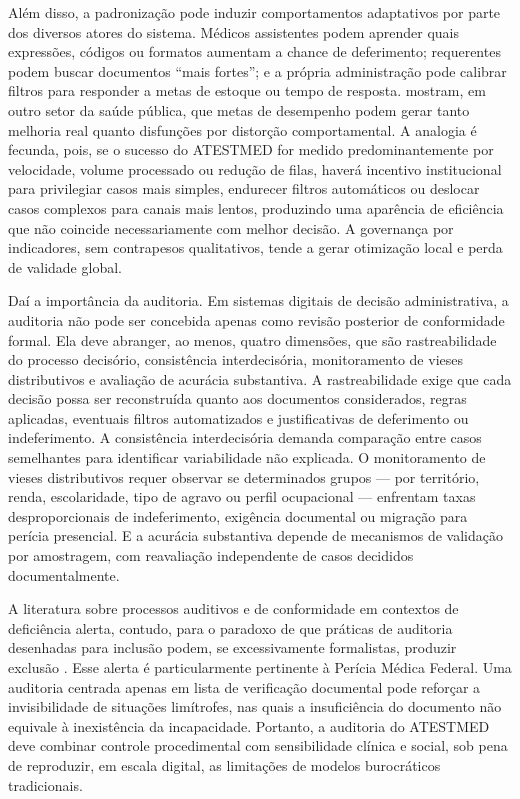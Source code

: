 \documentclass[12pt,a4paper]{article}
\begin{document}
Além disso, a padronização pode induzir comportamentos adaptativos por parte dos diversos atores do sistema. Médicos assistentes podem aprender quais expressões, códigos ou formatos aumentam a chance de deferimento; requerentes podem buscar documentos “mais fortes”; e a própria administração pode calibrar filtros para responder a metas de estoque ou tempo de resposta. \textcite{kelman2009performanceimprovementandperformancedysfunctionanemp} mostram, em outro setor da saúde pública, que metas de desempenho podem gerar tanto melhoria real quanto disfunções por distorção comportamental. A analogia é fecunda, pois, se o sucesso do ATESTMED for medido predominantemente por velocidade, volume processado ou redução de filas, haverá incentivo institucional para privilegiar casos mais simples, endurecer filtros automáticos ou deslocar casos complexos para canais mais lentos, produzindo uma aparência de eficiência que não coincide necessariamente com melhor decisão. A governança por indicadores, sem contrapesos qualitativos, tende a gerar otimização local e perda de validade global.

Daí a importância da auditoria. Em sistemas digitais de decisão administrativa, a auditoria não pode ser concebida apenas como revisão posterior de conformidade formal. Ela deve abranger, ao menos, quatro dimensões, que são rastreabilidade do processo decisório, consistência interdecisória, monitoramento de vieses distributivos e avaliação de acurácia substantiva. A rastreabilidade exige que cada decisão possa ser reconstruída quanto aos documentos considerados, regras aplicadas, eventuais filtros automatizados e justificativas de deferimento ou indeferimento. A consistência interdecisória demanda comparação entre casos semelhantes para identificar variabilidade não explicada. O monitoramento de vieses distributivos requer observar se determinados grupos — por território, renda, escolaridade, tipo de agravo ou perfil ocupacional — enfrentam taxas desproporcionais de indeferimento, exigência documental ou migração para perícia presencial. E a acurácia substantiva depende de mecanismos de validação por amostragem, com reavaliação independente de casos decididos documentalmente.

A literatura sobre processos auditivos e de conformidade em contextos de deficiência alerta, contudo, para o paradoxo de que práticas de auditoria desenhadas para inclusão podem, se excessivamente formalistas, produzir exclusão \parencite{deveau2011workplaceaccommodationandauditbasedevaluationprocess}. Esse alerta é particularmente pertinente à Perícia Médica Federal. Uma auditoria centrada apenas em lista de verificação documental pode reforçar a invisibilidade de situações limítrofes, nas quais a insuficiência do documento não equivale à inexistência da incapacidade. Portanto, a auditoria do ATESTMED deve combinar controle procedimental com sensibilidade clínica e social, sob pena de reproduzir, em escala digital, as limitações de modelos burocráticos tradicionais.
\end{document}
